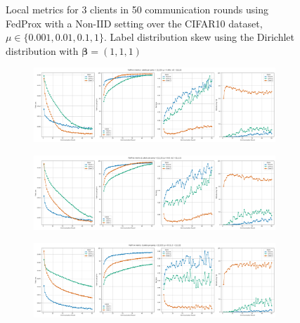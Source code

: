\begin{figure}[H]
    \caption{Local metrics for 3 clients in 50 communication rounds using FedProx with a Non-IID setting over the CIFAR10 dataset, $\mu \in \{0.001, 0.01, 0.1, 1\}$. Label distribution skew using the Dirichlet distribution with $\boldsymbol{\beta} = (1,1,1)$ }
    \label{fig:FedProx_Non_IID_Dirichlet_1}
\end{figure}


\begin{figure}[H]
    \centering

    \begin{subfigure}{\linewidth}
        \centering
        \includegraphics[width=0.8\linewidth]{figures/2-Federated_Learning/FedProx_LabelsPerParty_mu_0.001.png}
    \end{subfigure}
    \vspace{1em} %

    \begin{subfigure}{\linewidth}
        \centering
        \includegraphics[width=0.8\linewidth]{figures/2-Federated_Learning/FedProx_LabelsPerParty_mu_0.01.png}
    \end{subfigure}
    \vspace{1em} %

    \begin{subfigure}{\linewidth}
        \centering
        \includegraphics[width=0.8\linewidth]{figures/2-Federated_Learning/FedProx_LabelsPerParty_mu_0.1.png}
    \end{subfigure}
    \vspace{1em} %


\end{figure}
